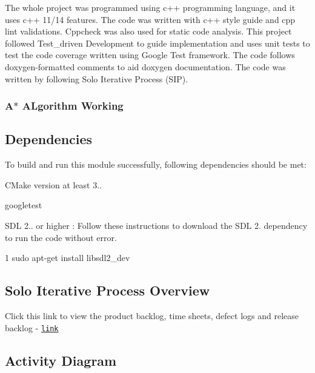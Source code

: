 The whole project was programmed using c++ programming language, and it uses c++ 11/14 features. The code was written with c++ style guide and cpp lint validations. Cppcheck was also used for static code analysis. This project followed Test\+\_\+driven Development to guide implementation and uses unit tests to test the code coverage written using Google Test framework. The code follows doxygen-\/formatted comments to aid doxygen documentation. The code was written by following Solo Iterative Process (S\+IP).

\subsubsection*{A$\ast$ A\+Lgorithm Working}



\subsection*{Dependencies}

To build and run this module successfully, following dependencies should be met\+:


\begin{DoxyItemize}
\item C\+Make version at least 3..
\item googletest
\item S\+DL 2.. or higher \+: Follow these instructions to download the S\+DL 2. dependency to run the code without error.
\end{DoxyItemize}


\begin{DoxyCode}
1 sudo apt-get install libsdl2\_dev
\end{DoxyCode}


\subsection*{Solo Iterative Process Overview}

Click this link to view the product backlog, time sheets, defect logs and release backlog -\/ \href{https://docs.google.com/spreadsheets/d/1dE0h7dNnQtP3aUuqrfs1r5tL3C8uaOQiwODgHtyh9s4/edit?usp=sharing}{\tt link}

\subsection*{Activity Diagram}



